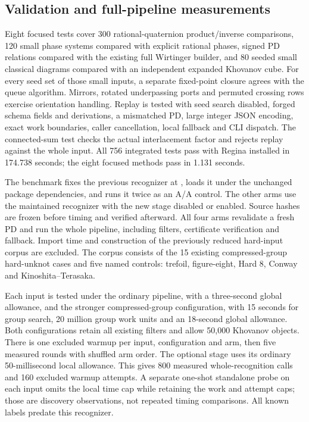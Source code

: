 \subsection{Validation and full-pipeline measurements}
Eight focused tests cover 300 rational-quaternion product/inverse comparisons,
120 small phase systems compared with explicit rational phases, signed PD
relations compared with the existing full Wirtinger builder, and 80 seeded
small classical diagrams compared with an independent expanded Khovanov cube.
For every seed set of those small inputs, a separate fixed-point closure
agrees with the queue algorithm. Mirrors, rotated underpassing ports and
permuted crossing rows exercise orientation handling. Replay is tested with
seed search disabled, forged schema fields and derivations, a mismatched PD,
large integer JSON encoding, exact work boundaries, caller cancellation,
local fallback and CLI dispatch. The connected-sum test checks the actual
interlacement factor and rejects replay against the whole input. All 756
integrated tests pass with Regina installed in 174.738 seconds; the eight
focused methods pass in 1.131 seconds.

The benchmark fixes the previous recognizer at , loads it
under the unchanged package dependencies, and runs it twice as an A/A control.
The other arms use the maintained recognizer with the new stage disabled or
enabled. Source hashes are frozen before timing and verified afterward.
All four arms revalidate a fresh PD and run the whole pipeline, including
filters, certificate verification and fallback. Import time and construction
of the previously reduced hard-input corpus are excluded. The corpus consists
of the 15 existing compressed-group hard-unknot cases and five named controls:
trefoil, figure-eight, Hard 8, Conway and Kinoshita--Terasaka.

Each input is tested under the ordinary pipeline, with a three-second global
allowance, and the stronger compressed-group configuration, with 15 seconds
for group search, 20 million group work units and an 18-second global
allowance. Both configurations retain all existing filters and allow 50,000
Khovanov objects. There is one excluded warmup per input, configuration and
arm, then five measured rounds with shuffled arm order. The optional stage
uses its ordinary 50-millisecond local allowance. This gives 800 measured
whole-recognition calls and 160 excluded warmup attempts. A separate one-shot
standalone probe on each input omits the local time cap while retaining the
work and attempt caps; those are discovery observations, not repeated timing
comparisons. All known labels predate this recognizer.

